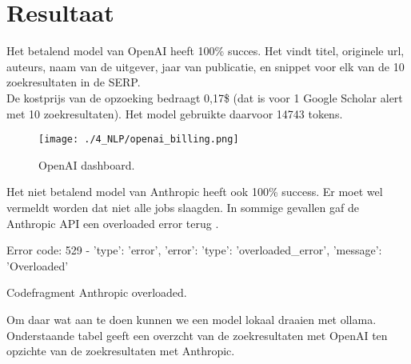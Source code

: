 \section{Resultaat}
Het betalend model van OpenAI heeft 100\% succes. Het vindt titel, originele url, auteurs, naam van de uitgever, jaar van publicatie, en snippet voor elk van de 10 zoekresultaten in de SERP.\\
De kostprijs van de opzoeking bedraagt 0,17\$ (dat is voor 1 Google Scholar alert met 10 zoekresultaten). Het model gebruikte daarvoor 14743 tokens. 
\begin{figure}
    \centering
    \texttt{[image: ./4\_NLP/openai\_billing.png]}
    \caption[OpenAI dashboard.]{\label{fig:OpenAI dashboard}OpenAI dashboard.}
\end{figure}
Het niet betalend model van Anthropic heeft ook 100\% success. Er moet wel vermeldt worden dat niet alle jobs slaagden. In sommige gevallen gaf de Anthropic API een overloaded error terug \autocite{AnthropicOverloaded2025}.
\begin{listing}
    Error code: 529 - {'type': 'error', 'error': {'type': 'overloaded_error', 'message': 'Overloaded'}}
    \caption[Anthropic overloaded codefragment]{Codefragment Anthropic overloaded.}
    \label{code:Anthropic overloaded codefragment}
\end{listing}
Om daar wat aan te doen kunnen we een model lokaal draaien met ollama.
Onderstaande tabel geeft een overzcht van de zoekresultaten met OpenAI ten opzichte van de zoekresultaten met Anthropic.
